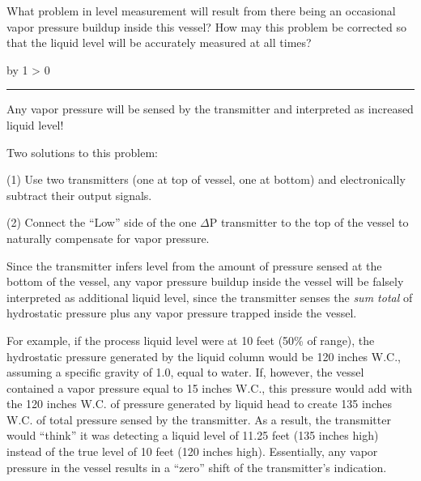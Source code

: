 \documentclass[12pt,a4paper]{article}
\def\svar{
           \advance\answnum by 1
           \ifnum \answnum > 0
                \hrule
                \vskip 3pt
                \leftline{Svar \the\answnum}
                \vskip 3pt \fi}
\begin{document}
What problem in level measurement will result from there being an occasional vapor pressure buildup inside this vessel?  How may this problem be corrected so that the liquid level will be accurately measured at all times?

\vskip 10pt \filbreak 





\svar{} 

Any vapor pressure will be sensed by the transmitter and interpreted as increased liquid level!

\vskip 10pt

Two solutions to this problem: 

\vskip 10pt {\narrower \noindent \baselineskip5pt

(1) Use two transmitters (one at top of vessel, one at bottom) and electronically subtract their output signals.

\par} \vskip 10pt



\vskip 10pt {\narrower \noindent \baselineskip5pt

(2) Connect the ``Low'' side of the one $\Delta$P transmitter to the top of the vessel to naturally compensate for vapor pressure.

\par} \vskip 10pt

Since the transmitter infers level from the amount of pressure sensed at the bottom of the vessel, any vapor pressure buildup inside the vessel will be falsely interpreted as additional liquid level, since the transmitter senses the {\it sum total} of hydrostatic pressure plus any vapor pressure trapped inside the vessel.

For example, if the process liquid level were at 10 feet (50\% of range), the hydrostatic pressure generated by the liquid column would be 120 inches W.C., assuming a specific gravity of 1.0, equal to water.  If, however, the vessel contained a vapor pressure equal to 15 inches W.C., this pressure would add with the 120 inches W.C. of pressure generated by liquid head to create 135 inches W.C. of total pressure sensed by the transmitter.  As a result, the transmitter would ``think'' it was detecting a liquid level of 11.25 feet (135 inches high) instead of the true level of 10 feet (120 inches high).  Essentially, any vapor pressure in the vessel results in a ``zero'' shift of the transmitter's indication.
\end{document}
